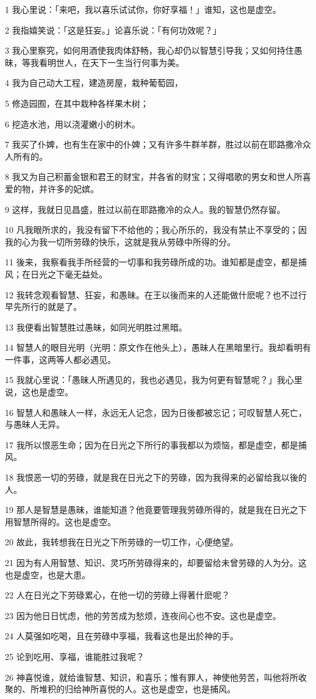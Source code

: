 \par 1 我心里说：「来吧，我以喜乐试试你，你好享福！」谁知，这也是虚空。
\par 2 我指嬉笑说：「这是狂妄。」论喜乐说：「有何功效呢？」
\par 3 我心里察究，如何用酒使我肉体舒畅，我心却仍以智慧引导我；又如何持住愚昧，等我看明世人，在天下一生当行何事为美。
\par 4 我为自己动大工程，建造房屋，栽种葡萄园，
\par 5 修造园囿，在其中栽种各样果木树；
\par 6 挖造水池，用以浇灌嫩小的树木。
\par 7 我买了仆婢，也有生在家中的仆婢；又有许多牛群羊群，胜过以前在耶路撒冷众人所有的。
\par 8 我又为自己积蓄金银和君王的财宝，并各省的财宝；又得唱歌的男女和世人所喜爱的物，并许多的妃嫔。
\par 9 这样，我就日见昌盛，胜过以前在耶路撒冷的众人。我的智慧仍然存留。
\par 10 凡我眼所求的，我没有留下不给他的；我心所乐的，我没有禁止不享受的；因我的心为我一切所劳碌的快乐，这就是我从劳碌中所得的分。
\par 11 後来，我察看我手所经营的一切事和我劳碌所成的功。谁知都是虚空，都是捕风；在日光之下毫无益处。
\par 12 我转念观看智慧、狂妄，和愚昧。在王以後而来的人还能做什麽呢？也不过行早先所行的就是了。
\par 13 我便看出智慧胜过愚昧，如同光明胜过黑暗。
\par 14 智慧人的眼目光明（光明：原文作在他头上），愚昧人在黑暗里行。我却看明有一件事，这两等人都必遇见。
\par 15 我就心里说：「愚昧人所遇见的，我也必遇见，我为何更有智慧呢？」我心里说，这也是虚空。
\par 16 智慧人和愚昧人一样，永远无人记念，因为日後都被忘记；可叹智慧人死亡，与愚昧人无异。
\par 17 我所以恨恶生命；因为在日光之下所行的事我都以为烦恼，都是虚空，都是捕风。
\par 18 我恨恶一切的劳碌，就是我在日光之下的劳碌，因为我得来的必留给我以後的人。
\par 19 那人是智慧是愚昧，谁能知道？他竟要管理我劳碌所得的，就是我在日光之下用智慧所得的。这也是虚空。
\par 20 故此，我转想我在日光之下所劳碌的一切工作，心便绝望。
\par 21 因为有人用智慧、知识、灵巧所劳碌得来的，却要留给未曾劳碌的人为分。这也是虚空，也是大患。
\par 22 人在日光之下劳碌累心，在他一切的劳碌上得著什麽呢？
\par 23 因为他日日忧虑，他的劳苦成为愁烦，连夜间心也不安。这也是虚空。
\par 24 人莫强如吃喝，且在劳碌中享福，我看这也是出於神的手。
\par 25 论到吃用、享福，谁能胜过我呢？
\par 26 神喜悦谁，就给谁智慧、知识，和喜乐；惟有罪人，神使他劳苦，叫他将所收聚的、所堆积的归给神所喜悦的人。这也是虚空，也是捕风。

